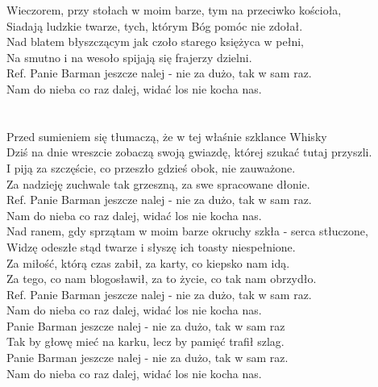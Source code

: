 
\hops
Wieczorem, przy stołach w moim barze, tym na przeciwko kościoła, \\
Siadają ludzkie twarze, tych, którym Bóg pomóc nie zdołał. \tab{} \\
Nad blatem błyszczącym jak czoło starego księżyca w pełni,\tab{} \\
Na smutno i na wesoło spijają się frajerzy dzielni. \tab{}\\
\hops
Ref. Panie Barman jeszcze nalej - nie za dużo, tak w sam raz. \tab{}\\
 Nam do nieba co raz dalej, widać los nie kocha nas.\tab{} \\
\tab{}\tab{}\tab{}\tab{}\\
\tab{}\tab{}\tab{}\tab{}\\
\tab{}\tab{}\tab{}\tab{}
\hops 
Przed sumieniem się tłumaczą, że w tej właśnie szklance Whisky \\
Dziś na dnie wreszcie zobaczą swoją gwiazdę, której szukać tutaj przyszli. \\
I piją za szczęście, co przeszło gdzieś obok, nie zauważone. \\
Za nadzieję zuchwale tak grzeszną, za swe spracowane dłonie. \\
\hops
Ref. Panie Barman jeszcze nalej - nie za dużo, tak w sam raz. \\
 Nam do nieba co raz dalej, widać los nie kocha nas. \\
\hops
Nad ranem, gdy sprzątam w moim barze okruchy szkła - serca stłuczone, \\
Widzę odeszłe stąd twarze i słyszę ich toasty niespełnione. \\
Za miłość, którą czas zabił, za karty, co kiepsko nam idą. \\
Za tego, co nam blogosławił, za to życie, co tak nam obrzydło. \\
\hops
Ref. Panie Barman jeszcze nalej - nie za dużo, tak w sam raz. \\
 Nam do nieba co raz dalej, widać los nie kocha nas. \\
 Panie Barman jeszcze nalej - nie za dużo, tak w sam raz \\
 Tak by głowę mieć na karku, lecz by pamięć trafił szlag. \\
 Panie Barman jeszcze nalej - nie za dużo, tak w sam raz. \\
 Nam do nieba co raz dalej, widać los nie kocha nas. 